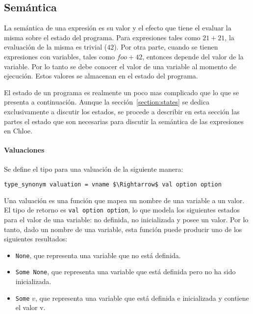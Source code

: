 \subsection{Semántica}\label{subsection:semantics_expressions}

La semántica de una expresión es su valor y el efecto que tiene el evaluar la misma sobre el estado del programa.
Para expresiones tales como $21 + 21$, la evaluación de la misma es trivial ($42$).
Por otra parte, cuando se tienen expresiones con variables, tales como $foo + 42$, entonces depende del valor de la variable.
Por lo tanto se debe conocer el valor de una variable al momento de ejecución.
Estos valores se almacenan en el estado del programa.

El estado de un programa es realmente un poco mas complicado que lo que se presenta a continuación.
Aunque la sección~\ref{section:states} se dedica exclusivamente a discutir los estados, se procede a describir en esta sección las partes el estado que son necesarias para discutir la semántica de las expresiones en Chloe.

\paragraph*{Valuaciones}\label{paragraph:valuation}

Se define el tipo para una valuación de la siguiente manera:

\begin{lstlisting}[frame=single, mathescape=true]
type_synonym valuation = vname $\Rightarrow$ val option option
\end{lstlisting}

Una valuación es una función que mapea un nombre de una variable a un valor.
El tipo de retorno es \verb|val option option|, lo que modela los siguientes estados para el valor de una variable: no definida, no inicializada y posee un valor.
Por lo tanto, dado un nombre de una variable, esta función puede producir uno de los siguientes resultados:

\begin{itemize}
  \item{\verb|None|, que representa una variable que no está definida.}
  \item{\verb|Some None|, que representa una variable que está definida pero no ha sido inicializada.}
  \item{\verb|Some| $v$, que representa una variable que está definida e inicializada y contiene el valor v.}
\end{itemize}

